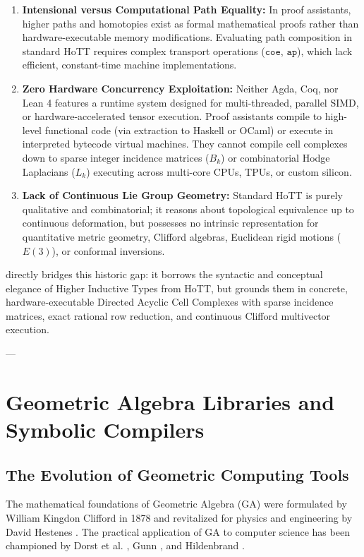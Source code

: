 \begin{enumerate}[leftmargin=1.2cm]
    \item \textbf{Intensional versus Computational Path Equality:}  
    In proof assistants, higher paths and homotopies exist as formal mathematical proofs rather than hardware-executable memory modifications. Evaluating path composition in standard HoTT requires complex transport operations ($\texttt{coe}$, $\texttt{ap}$), which lack efficient, constant-time machine implementations.

    \item \textbf{Zero Hardware Concurrency Exploitation:}  
    Neither Agda, Coq, nor Lean 4 features a runtime system designed for multi-threaded, parallel SIMD, or hardware-accelerated tensor execution. Proof assistants compile to high-level functional code (via extraction to Haskell or OCaml) or execute in interpreted bytecode virtual machines. They cannot compile cell complexes down to sparse integer incidence matrices ($B_k$) or combinatorial Hodge Laplacians ($L_k$) executing across multi-core CPUs, TPUs, or custom silicon.

    \item \textbf{Lack of Continuous Lie Group Geometry:}  
    Standard HoTT is purely qualitative and combinatorial; it reasons about topological equivalence up to continuous deformation, but possesses no intrinsic representation for quantitative metric geometry, Clifford algebras, Euclidean rigid motions ($E(3)$), or conformal inversions.
\end{enumerate}

\ToposLang{} directly bridges this historic gap: it borrows the syntactic and conceptual elegance of Higher Inductive Types from HoTT, but grounds them in concrete, hardware-executable Directed Acyclic Cell Complexes with sparse incidence matrices, exact rational row reduction, and continuous Clifford multivector execution.

---

\section{Geometric Algebra Libraries and Symbolic Compilers}
\label{sec:ga_libraries}

\subsection{The Evolution of Geometric Computing Tools}
The mathematical foundations of Geometric Algebra (GA) were formulated by William Kingdon Clifford in 1878 \cite{clifford1878applications} and revitalized for physics and engineering by David Hestenes \cite{hestenes1984clifford}. The practical application of GA to computer science has been championed by Dorst et al. \cite{dorst2007geometric}, Gunn \cite{gunn2017guided}, and Hildenbrand \cite{hildenbrand2012foundations, hildenbrand2020power}.

